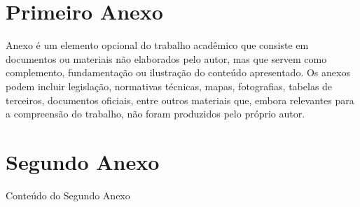\begin{anexosenv}

\chapter{Primeiro Anexo}

Anexo é um elemento opcional do trabalho acadêmico que consiste em documentos ou materiais não elaborados pelo autor, mas que servem como complemento, fundamentação ou ilustração do conteúdo apresentado. Os anexos podem incluir legislação, normativas técnicas, mapas, fotografias, tabelas de terceiros, documentos oficiais, entre outros materiais que, embora relevantes para a compreensão do trabalho, não foram produzidos pelo próprio autor.

\chapter{Segundo Anexo}

Conteúdo do Segundo Anexo

\end{anexosenv}